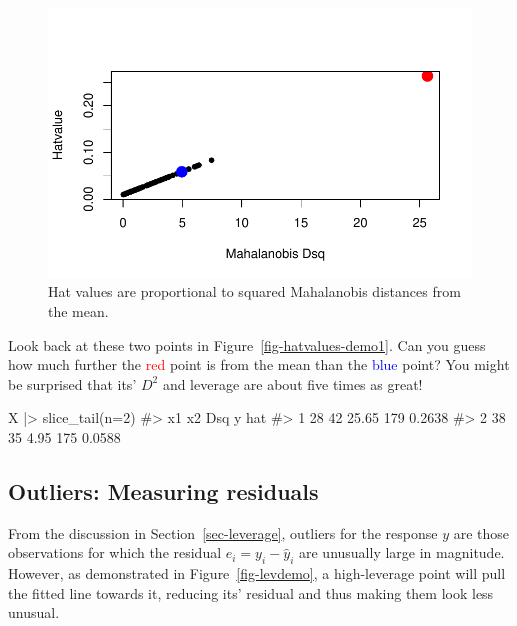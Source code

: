 \documentclass[
  letterpaper,
  10pt,
  krantz2]{krantz}
\makeatletter
\newenvironment{Shaded}{\begin{snugshade}}{\end{snugshade}}
\newcommand{\AttributeTok}[1]{\textcolor[rgb]{0.40,0.45,0.13}{#1}}
\newcommand{\CommentTok}[1]{\textcolor[rgb]{0.37,0.37,0.37}{#1}}
\newcommand{\DecValTok}[1]{\textcolor[rgb]{0.68,0.00,0.00}{#1}}
\newcommand{\FunctionTok}[1]{\textcolor[rgb]{0.28,0.35,0.67}{#1}}
\newcommand{\NormalTok}[1]{\textcolor[rgb]{0.00,0.23,0.31}{#1}}
\newcommand{\SpecialCharTok}[1]{\textcolor[rgb]{0.37,0.37,0.37}{#1}}
\newenvironment{kframe}{%
  \medskip{}
  \setlength{\fboxsep}{.8em}
  \def\at@end@of@kframe{}%
  \ifinner\ifhmode%
  \def\at@end@of@kframe{\end{minipage}}%
  \begin{minipage}{\columnwidth}%
  \fi\fi%
  \def\FrameCommand##1{\hskip\@totalleftmargin \hskip-\fboxsep
  \colorbox{shadecolor}{##1}\hskip-\fboxsep
      \hskip-\linewidth \hskip-\@totalleftmargin \hskip\columnwidth}%
  \MakeFramed {\advance\hsize-\width
    \@totalleftmargin\z@ \linewidth\hsize
    \@setminipage}}%
{\par\unskip\endMakeFramed%
  \at@end@of@kframe}
\renewenvironment{Shaded}{\begin{kframe}}{\end{kframe}}
\makeatother
\begin{document}
\begin{figure}[H]

{\centering \includegraphics{figs/fig-hatvalues-demo2-1.pdf}

}

\caption{\label{fig-hatvalues-demo2}Hat values are proportional to
squared Mahalanobis distances from the mean.}

\end{figure}

Look back at these two points in Figure~\ref{fig-hatvalues-demo1}. Can
you guess how much further the \textcolor{red}{red} point is from the
mean than the \textcolor{blue}{blue} point? You might be surprised that
its' \(D^2\) and leverage are about five times as great!

\begin{Shaded}
\begin{Highlighting}[]
\NormalTok{X }\SpecialCharTok{|\textgreater{}} \FunctionTok{slice\_tail}\NormalTok{(}\AttributeTok{n=}\DecValTok{2}\NormalTok{)}
\CommentTok{\#\textgreater{}   x1 x2   Dsq   y    hat}
\CommentTok{\#\textgreater{} 1 28 42 25.65 179 0.2638}
\CommentTok{\#\textgreater{} 2 38 35  4.95 175 0.0588}
\end{Highlighting}
\end{Shaded}

\hypertarget{outliers-measuring-residuals}{%
\subsection{Outliers: Measuring
residuals}\label{outliers-measuring-residuals}}

From the discussion in Section~\ref{sec-leverage}, outliers for the
response \(y\) are those observations for which the residual
\(e_i = y_i - \hat{y}_i\) are unusually large in magnitude. However, as
demonstrated in Figure~\ref{fig-levdemo}, a high-leverage point will
pull the fitted line towards it, reducing its' residual and thus making
them look less unusual.
\end{document}
